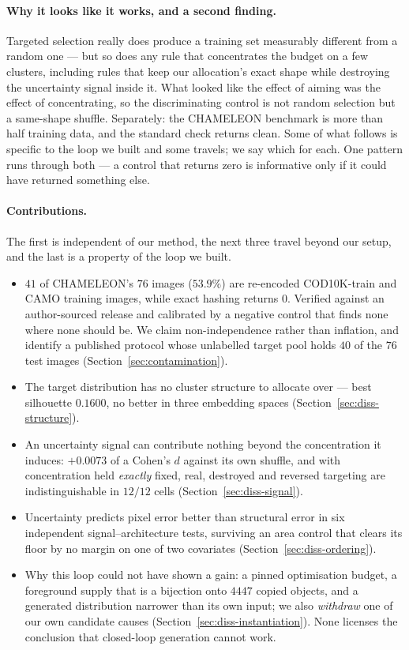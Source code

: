 \documentclass{article} %
\begin{document}
\paragraph{Why it looks like it works, and a second finding.} Targeted selection really does produce
a training set measurably different from a random one --- but so does any rule that concentrates the
budget on a few clusters, including rules that keep our allocation's exact shape while destroying
the uncertainty signal inside it. What looked like the effect of aiming was the effect of
concentrating, so the discriminating control is not random selection but a same-shape shuffle.
Separately: the CHAMELEON benchmark is more than half training data, and the standard check returns
clean. Some of what follows is specific to the loop we built and some travels; we say which for
each. One pattern runs through both --- a control that returns zero is informative only if it could
have returned something else.

\paragraph{Contributions.} The first is independent of our method, the next three travel beyond our
setup, and the last is a property of the loop we built.

\begin{itemize}
\itemsep0.02em
\item $41$ of CHAMELEON's $76$ images ($53.9\%$) are re-encoded COD10K-train and CAMO training
images, while exact hashing returns $0$. Verified against an author-sourced release and calibrated
by a negative control that finds none where none should be. We claim non-independence rather than
inflation, and identify a published protocol whose unlabelled target pool holds $40$ of the $76$ test images
(Section~\ref{sec:contamination}).
\item The target distribution has no cluster structure to allocate over --- best silhouette
$0.1600$, no better in three embedding spaces (Section~\ref{sec:diss-structure}).
\item An uncertainty signal can contribute nothing beyond the concentration it induces: $+0.0073$ of
a Cohen's $d$ against its own shuffle, and with concentration held \emph{exactly} fixed, real,
destroyed and reversed targeting are indistinguishable in $12/12$ cells
(Section~\ref{sec:diss-signal}).
\item Uncertainty predicts pixel error better than structural error in six independent
signal--architecture tests, surviving an area control that clears its floor by no margin on one of
two covariates (Section~\ref{sec:diss-ordering}).
\item Why this loop could not have shown a gain: a pinned optimisation budget, a foreground supply
that is a bijection onto $4447$ copied objects, and a generated distribution narrower than its own
input; we also \emph{withdraw} one of our own candidate causes
(Section~\ref{sec:diss-instantiation}). None licenses the conclusion that closed-loop generation
cannot work.
\end{itemize}
\end{document}
